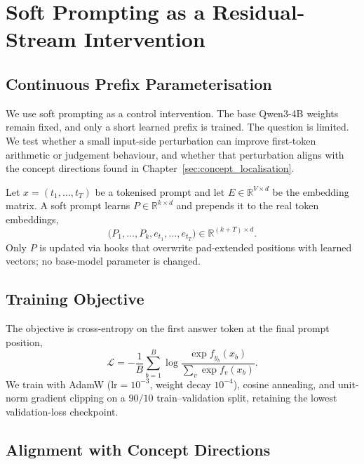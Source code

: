 \chapter{Soft Prompting as a Residual-Stream Intervention}
\label{sec:k_e}

\section{Continuous Prefix Parameterisation}
\label{sec:soft_prompting}

We use soft prompting as a control intervention. The base Qwen3-4B weights remain fixed, and only a short learned prefix is trained. The question is limited. We test whether a small input-side perturbation can improve first-token arithmetic or judgement behaviour, and whether that perturbation aligns with the concept directions found in Chapter~\ref{sec:concept_localisation}.

Let $x=(t_1,\ldots,t_T)$ be a tokenised prompt and let $E\in\mathbb{R}^{V\times d}$ be the embedding matrix. A soft prompt learns $P\in\mathbb{R}^{k\times d}$ and prepends it to the real token embeddings,
\begin{equation}
\bigl(P_1,\ldots,P_k,e_{t_1},\ldots,e_{t_T}\bigr)
\in \mathbb{R}^{(k+T)\times d}.
\label{eq:soft_prompt_seq}
\end{equation}
Only $P$ is updated via hooks that overwrite pad-extended positions with learned vectors; no base-model parameter is changed.

\section{Training Objective}
\label{sec:soft_prompt_training}

The objective is cross-entropy on the first answer token at the final prompt position,
\begin{equation}
\mathcal{L}
=
-\frac{1}{B}\sum_{b=1}^{B}
\log
\frac{\exp f_{y_b}(x_b)}
     {\sum_v \exp f_v(x_b)}.
\label{eq:soft_prompt_loss}
\end{equation}
We train with AdamW ($\mathrm{lr}=10^{-3}$, weight decay $10^{-4}$), cosine annealing, and unit-norm gradient clipping on a $90/10$ train--validation split, retaining the lowest validation-loss checkpoint.

\section{Alignment with Concept Directions}
\label{sec:soft_prompt_alignment}

